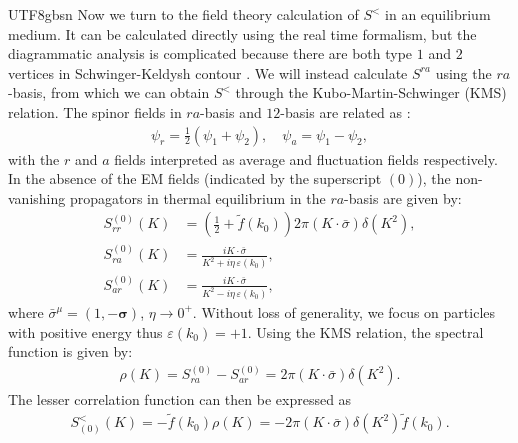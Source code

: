 \documentclass[11pt]{article}\def\baselinestretch{1.4}
\def\d{{\delta}}
\def\p{{\pi}}
\def\s{{\sigma}}
\begin{document}
\begin{CJK}{UTF8}{gbsn}
Now we turn to the field theory calculation of $S^<$ in an equilibrium medium. It can be calculated directly using the real time formalism, but the diagrammatic analysis is complicated because there are both type $1$ and $2$ vertices in Schwinger-Keldysh contour \cite{le2000thermal}. We will instead calculate $S^{ra}$ using the $ra$-basis, from which we can obtain $S^<$ through the Kubo-Martin-Schwinger (KMS) relation.
The spinor fields in $ra$-basis and $12$-basis are related as \cite{Chou:1984es}:
\begin{align}
    \psi _r = \frac{1}{2}(\psi _1 + \psi _2), \quad \psi _a = \psi _1 - \psi _2,
\end{align}
with the $r$ and $a$ fields interpreted as average and fluctuation fields respectively.
In the absence of the EM fields (indicated by the superscript $(0)$), the non-vanishing propagators in thermal equilibrium in the $ra$-basis are given by:
\begin{align}
    S_{rr}^{(0)}(K)&=(\frac{1}{2}+\tilde{f}(k_0))2\p(K\cdot\bar{\s})\d(K^2),\label{S_prop1}\\
    S_{ra}^{(0)}(K)&=\frac{iK \cdot \bar{\sigma}}{K^2+i \eta\,\varepsilon(k_0)}, \label{S_prop2}\\
    S_{ar}^{(0)}(K)&=\frac{iK \cdot \bar{\sigma}}{K^2-i \eta\,\varepsilon(k_0)},\label{S_prop3}
\end{align}
where $\bar{\sigma}^\mu=(1,-\boldsymbol{\sigma})$, $\eta \to 0^+$. Without loss of generality, we focus on particles with positive energy thus $\varepsilon(k_0)=+1$. Using the KMS relation, the spectral function is given by:
\begin{align}
    \rho (K) = S_{ra}^{(0)}-S_{ar}^{(0)} = 2\pi (K \cdot \bar{\sigma})\delta (K^2) .\label{spectral_function}
\end{align}
The lesser correlation function can then be expressed as
\begin{align}
    S^<_{(0)}(K)=-\tilde{f}(k_0)\rho (K)=-2\pi (K \cdot \bar{\sigma})\delta (K^2)\tilde{f}(k_0) \label{free_lesser_propagator}.
\end{align}


\end{CJK}
\end{document}
